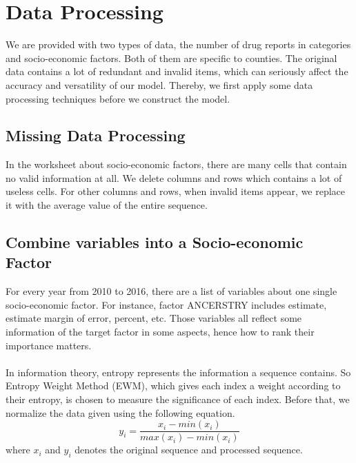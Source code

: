 \documentclass[12pt]{article}
\newcommand{\upcite}[1]{\textsuperscript{\textsuperscript{\cite{#1}}}}
\begin{document}
\section{Data Processing}
We are provided with two types of data, the number of drug reports in categories and socio-economic factors. Both of them are specific to counties. The original data contains a lot of redundant and invalid items, which can seriously affect the accuracy and versatility of our model. Thereby, we first apply some data processing techniques before we construct the model.

\subsection{Missing Data Processing}
In the worksheet about socio-economic factors, there are many cells that contain no valid information at all. We delete columns and rows which contains a lot of useless cells. For other columns and rows, when invalid items appear, we replace it with the average value of the entire sequence.

\subsection{Combine variables into a Socio-economic Factor}
For every year from 2010 to 2016, there are a list of variables about one single socio-economic factor. For instance, factor ANCERSTRY includes estimate, estimate margin of error, percent, etc. Those variables all reflect some information of the target factor in some aspects, hence how to rank their importance matters. 

In information theory, entropy represents the information a sequence contains\upcite{3}. So Entropy Weight Method (EWM), which gives each index a weight according to their entropy, is chosen to measure the significance of each index. Before that, we normalize the data given using the following equation.
\begin{equation}
	y_{i} = \frac{x_{i}-min(x_{i})}{max(x_{i}) - min(x_{i})}
\end{equation}
where $x_{i}$ and $y_{i}$ denotes the original sequence and processed sequence.
\end{document}
